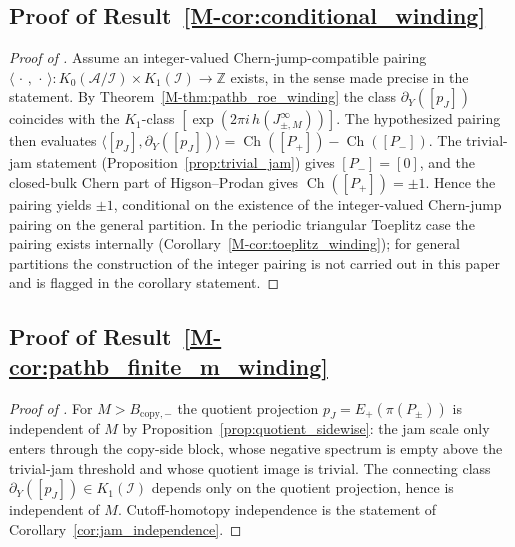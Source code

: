 \documentclass[11pt]{article}
\numberwithin{equation}{section}
\theoremstyle{definition}
\theoremstyle{remark}
\newcommand{\Ch}{\operatorname{Ch}}
\begin{document}
\subsection{Proof of Result~\ref{M-cor:conditional_winding}}\label{app:proof:cor:conditional_winding}
\begin{proof}[Proof of ]
Assume an integer-valued Chern-jump-compatible pairing
\(\langle\,\cdot\,,\,\cdot\,\rangle:K_0(\mathcal A/\mathcal I)\times K_1(\mathcal I)\to\mathbb Z\)
exists, in the sense made precise in the statement. By
Theorem~\ref{M-thm:pathb_roe_winding} the class \(\partial_Y([p_J])\) coincides with the
\(K_1\)-class \([\exp(2\pi i\,h(J_{\pm,M}^\infty))]\). The hypothesized pairing then evaluates
\(\langle [p_J],\partial_Y([p_J])\rangle=\Ch([P_+])-\Ch([P_-])\). The trivial-jam statement
(Proposition~\ref{prop:trivial_jam}) gives \([P_-]=[0]\), and the closed-bulk Chern part of
Higson--Prodan \cite{HigsonProdanUniversalPRL,HigsonProdanUniversalArxiv} gives
\(\Ch([P_+])=\pm1\). Hence the pairing yields \(\pm1\), conditional on the existence of the
integer-valued Chern-jump pairing on the general partition. In the periodic triangular Toeplitz
case the pairing exists internally (Corollary~\ref{M-cor:toeplitz_winding}); for general
partitions the construction of the integer pairing is not carried out in this paper and is
flagged in the corollary statement.
\end{proof}

\subsection{Proof of Result~\ref{M-cor:pathb_finite_m_winding}}\label{app:proof:cor:pathb_finite_m_winding}
\begin{proof}[Proof of ]
For \(M>B_{\mathrm{copy},-}\) the quotient projection \(p_J=E_+(\pi(P_\pm))\) is independent of
\(M\) by Proposition~\ref{prop:quotient_sidewise}: the jam scale only enters through the
copy-side block, whose negative spectrum is empty above the trivial-jam threshold and whose
quotient image is trivial. The connecting class \(\partial_Y([p_J])\in K_1(\mathcal I)\)
depends only on the quotient projection, hence is independent of \(M\). Cutoff-homotopy
independence is the statement of Corollary~\ref{cor:jam_independence}.
\end{proof}
\end{document}
